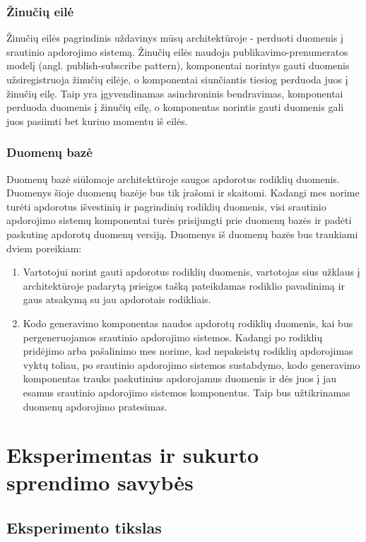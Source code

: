 \documentclass{VUMIFPSbakalaurinis}
\begin{document}
\subsubsection{Žinučių eilė}

Žinučių eilės pagrindinis uždavinys mūsų architektūroje - perduoti duomenis į srautinio apdorojimo sistemą. Žinučių eilės naudoja publikavimo-prenumeratos modelį (angl. publish-subscribe pattern), komponentai norintys gauti duomenis užsiregistruoja žinučių eilėje, o komponentai siunčiantis tiesiog perduoda juos į žinučių eilę. Taip yra įgyvendinamas asinchroninis bendravimas, komponentai perduoda duomenis į žinučių eilę, o komponentas norintis gauti duomenis gali juos pasiimti bet kuriuo momentu iš eilės.

\subsubsection{Duomenų bazė}

Duomenų bazė siūlomoje architektūroje saugos apdorotus rodiklių duomenis. Duomenys šioje duomenų bazėje bus tik įrašomi ir skaitomi. Kadangi mes norime turėti apdorotus išvestinių ir pagrindinių rodiklių duomenis, visi srautinio apdorojimo sistemų komponentai turės prisijungti prie duomenų bazės ir padėti paskutinę apdorotų duomenų versiją. Duomenys iš duomenų bazės bus traukiami dviem poreikiam: 
\begin{enumerate}
    \item Vartotojui norint gauti apdorotus rodiklių duomenis, vartotojas sius užklaus į architektūroje padarytą prieigos tašką pateikdamas rodiklio pavadinimą ir gaus atsakymą su jau apdorotais rodikliais. 
    \item Kodo generavimo komponentas naudos apdorotų rodiklių duomenis, kai bus pergeneruojamos srautinio apdorojimo sistemos.  Kadangi po rodiklių pridėjimo arba pašalinimo mes norime, kad nepakeistų rodiklių apdorojimas vyktų toliau, po srautinio apdorojimo sistemos sustabdymo, kodo generavimo komponentas trauks paskutinius apdorojamus duomenis ir dės juos į jau esamus srautinio apdorojimo sistemos komponentus. Taip bus užtikrinamas duomenų apdorojimo pratesimas.   
\end{enumerate}  


\section{Eksperimentas ir sukurto sprendimo savybės}

\subsection{Eksperimento tikslas}
\end{document}
